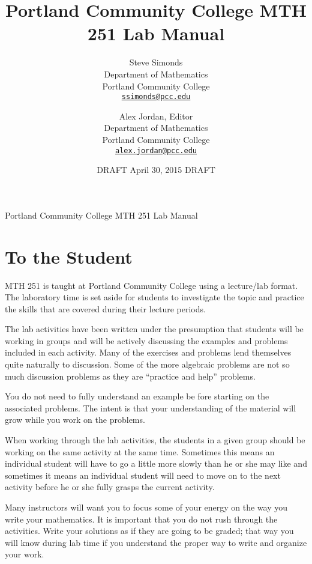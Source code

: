 \documentclass[12pt,]{book}
\title{Portland Community College MTH 251 Lab Manual}
\author{Steve Simonds\\
Department of Mathematics\\
Portland Community College\\
\href{mailto:ssimonds@pcc.edu}{\nolinkurl{ssimonds@pcc.edu}}
\and
Alex Jordan, Editor\\
Department of Mathematics\\
Portland Community College\\
\href{mailto:alex.jordan@pcc.edu}{\nolinkurl{alex.jordan@pcc.edu}}
}
\date{DRAFT April 30, 2015 DRAFT}
\theoremstyle{plain}
\theoremstyle{definition}
\numberwithin{equation}{section}
\begin{document}
\frontmatter
\thispagestyle{empty}
\begin{center}
{\Huge Portland Community College MTH 251 Lab Manual}
\end{center}\par
{}
\clearpage
\thispagestyle{empty}
\clearpage
\maketitle
\clearpage
\thispagestyle{empty}
\clearpage
\setcounter{tocdepth}{1}
\renewcommand*\contentsname{Contents}
\tableofcontents
\chapter*{To the Student}\label{to-the-student}
MTH 251 is taught at Portland Community College using a lecture/lab format. The laboratory time is set aside for students to investigate the topic and practice the skills that are covered during their lecture periods.%
\par
The lab activities have been written under the presumption that students will be working in groups and will be actively discussing the examples and problems included in each activity. Many of the exercises and problems lend themselves quite naturally to discussion. Some of the more algebraic problems are not so much discussion problems as they are ``practice and help'' problems.%
\par
You do not need to fully understand an example be fore starting on the associated problems. The intent is that your understanding of the material will grow while you work on the problems.%
\par
When working through the lab activities, the students in a given group should be working on the same activity at the same time. Sometimes this means an individual student will have to go a little more slowly than he or she may like and sometimes it means an individual student will need to move on to the next activity before he or she fully grasps the current activity.%
\par
Many instructors will want you to focus some of your energy on the way you write your mathematics. It is important that you do not rush through the activities. Write your solutions as if they are going to be graded; that way you will know during lab time if you understand the proper way to write and organize your work.%
\end{document}
